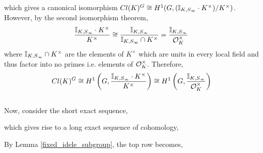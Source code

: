 \documentclass[12pt]{extarticle}
\begin{document}
\begin{center}
\end{center}
which gives a canonical isomorphism $Cl(K)^G \cong H^1(G, (\mathbb{I}_{K, S_\infty} \cdot K^\times)/K^\times)$. However, by the second isomorphism theorem,
\[ \frac{\mathbb{I}_{K, S_\infty} \cdot K^\times}{K^\times} \cong \frac{\mathbb{I}_{K, S_\infty}}{\mathbb{I}_{K, S_\infty} \cap K^\times} = \frac{\mathbb{I}_{K, S_\infty}}{\mathcal{O}_{K}^\times}  \]
where $\mathbb{I}_{K, S_\infty} \cap K^\times$ are the elements of $K^\times$ which are units in every local field and thus factor into no primes i.e. elements of $\mathcal{O}_{K}^\times$.
Therefore,
\[ Cl(K)^G \cong  H^1\left(G, \frac{\mathbb{I}_{K, S_\infty} \cdot K^\times}{K^\times}\right) \cong H^1\left(G, \frac{\mathbb{I}_{K, S_\infty}}{\mathcal{O}_{K}^\times}\right) \]
\bigskip\\
Now, consider the short exact sequence,
\begin{center}
\end{center}
which gives rise to a long exact sequence of cohomology,
\begin{center}
\end{center}
By Lemma \ref{fixed_idele_subgroup}, the top row becomes,
\begin{center}
\end{center}
\end{document}
